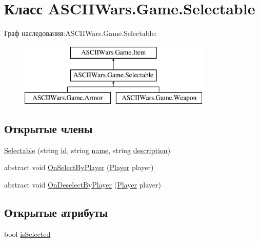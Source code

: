 \hypertarget{class_a_s_c_i_i_wars_1_1_game_1_1_selectable}{}\section{Класс A\+S\+C\+I\+I\+Wars.\+Game.\+Selectable}
\label{class_a_s_c_i_i_wars_1_1_game_1_1_selectable}
Граф наследования\+:A\+S\+C\+I\+I\+Wars.\+Game.\+Selectable\+:\begin{figure}[H]
\begin{center}
\leavevmode
\includegraphics[height=3.000000cm]{class_a_s_c_i_i_wars_1_1_game_1_1_selectable}
\end{center}
\end{figure}
\subsection*{Открытые члены}
\begin{DoxyCompactItemize}
\item 
\hyperlink{class_a_s_c_i_i_wars_1_1_game_1_1_selectable_aa473dd0350842e4adfefa8e71accadd2}{Selectable} (string \hyperlink{class_a_s_c_i_i_wars_1_1_game_1_1_item_a744d51f7684a4e46a1f834f8666db58e}{id}, string \hyperlink{class_a_s_c_i_i_wars_1_1_game_1_1_item_a994b9ec5f10c123e4345da159c090091}{name}, string \hyperlink{class_a_s_c_i_i_wars_1_1_game_1_1_item_a6ff41e953ccebc64a8df8f8c434535a0}{description})
\item 
abstract void \hyperlink{class_a_s_c_i_i_wars_1_1_game_1_1_selectable_a95bdcf05ef9ea5f39c81ddd96294968a}{On\+Select\+By\+Player} (\hyperlink{class_a_s_c_i_i_wars_1_1_game_1_1_player}{Player} player)
\item 
abstract void \hyperlink{class_a_s_c_i_i_wars_1_1_game_1_1_selectable_a08a30c8786367bf45355e989b109c44b}{On\+Deselect\+By\+Player} (\hyperlink{class_a_s_c_i_i_wars_1_1_game_1_1_player}{Player} player)
\end{DoxyCompactItemize}
\subsection*{Открытые атрибуты}
\begin{DoxyCompactItemize}
\item 
bool \hyperlink{class_a_s_c_i_i_wars_1_1_game_1_1_selectable_ad864445e5408f11f74f2e5c843677fb2}{is\+Selected}
\end{DoxyCompactItemize}


